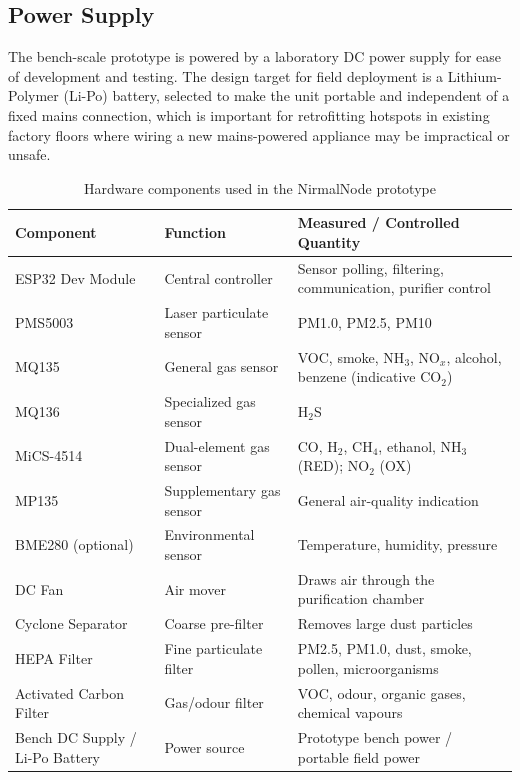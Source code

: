 \subsection{Power Supply}
The bench-scale prototype is powered by a laboratory DC power supply for ease of development and testing. The design target for field deployment is a Lithium-Polymer (Li-Po) battery, selected to make the unit portable and independent of a fixed mains connection, which is important for retrofitting hotspots in existing factory floors where wiring a new mains-powered appliance may be impractical or unsafe.

\begin{table}[htbp]
\centering
\caption{Hardware components used in the NirmalNode prototype}
\label{tab:hardware-components}
\small
\begin{tabular}{@{}p{3.4cm}p{5.2cm}p{5.2cm}@{}}
\toprule
\textbf{Component} & \textbf{Function} & \textbf{Measured / Controlled Quantity} \\
\midrule
ESP32 Dev Module & Central controller & Sensor polling, filtering, communication, purifier control \\
PMS5003 & Laser particulate sensor & PM1.0, PM2.5, PM10 \\
MQ135 & General gas sensor & VOC, smoke, NH$_3$, NO$_x$, alcohol, benzene (indicative CO$_2$) \\
MQ136 & Specialized gas sensor & H$_2$S \\
MiCS-4514 & Dual-element gas sensor & CO, H$_2$, CH$_4$, ethanol, NH$_3$ (RED); NO$_2$ (OX) \\
MP135 & Supplementary gas sensor & General air-quality indication \\
BME280 (optional) & Environmental sensor & Temperature, humidity, pressure \\
DC Fan & Air mover & Draws air through the purification chamber \\
Cyclone Separator & Coarse pre-filter & Removes large dust particles \\
HEPA Filter & Fine particulate filter & PM2.5, PM1.0, dust, smoke, pollen, microorganisms \\
Activated Carbon Filter & Gas/odour filter & VOC, odour, organic gases, chemical vapours \\
Bench DC Supply / Li-Po Battery & Power source & Prototype bench power / portable field power \\
\bottomrule
\end{tabular}
\end{table}

